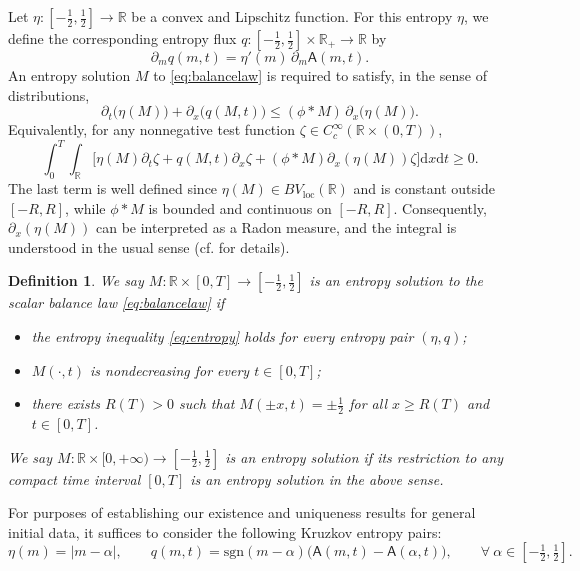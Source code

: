 \documentclass[10pt,a4paper]{amsart}
\newtheorem{definition}{Definition}[section]
\def\R{\mathbb{R}}
\def\dd{\mathrm{d}}
\def\pa{\partial}
\def\loc{\mathrm{loc}}
\def\A{\mathsf{A}}
\newcommand{\sgn}[1]{\mathrm{sgn}(#1)}
\begin{document}
	Let $\eta:[-\tfrac12,\tfrac12]\to \R$ be a convex and Lipschitz function. For this entropy $\eta$, we define the corresponding entropy flux $q:[-\tfrac12,\tfrac12]\times \R_+\to \R$ by
	\[
	\pa_m q(m,t) = \eta'(m)\, \pa_m \A(m,t).
	\]
	An entropy solution $M$ to \eqref{eq:balancelaw} is required to satisfy, in the sense of distributions,
	\begin{equation} \label{eq:entropy}
		\pa_t\big(\eta(M)\big) + \pa_x\big(q(M,t)\big) \le (\phi\ast M)\,\pa_x\big(\eta(M)\big).
	\end{equation}
	Equivalently, for any nonnegative test function $\zeta\in C_c^\infty(\R\times (0,T))$,
	\begin{equation} \label{eq:entropydist}
		\int_0^{T} \int_\R \Big[\eta(M) \pa_t \zeta + q(M,t)\pa_x \zeta 
		+ (\phi\ast M)\pa_x (\eta(M))\zeta \Big] \dd x \dd t \ge 0.
	\end{equation}
	The last term is well defined since $\eta(M)\in BV_{\loc}(\R)$ and is constant outside $[-R,R]$, while $\phi*M$ is bounded and continuous on $[-R,R]$. Consequently, $\pa_x(\eta(M))$ can be interpreted as a Radon measure, and the integral is understood in the usual sense (cf. \cite{leslie2023sticky} for details).
	
	\begin{definition}
			We say $M : \R \times [0,T] \to [-\frac12,\frac12]$ is an \emph{entropy solution} to the scalar balance law \eqref{eq:balancelaw} if
		\begin{itemize}
			\item the entropy inequality \eqref{eq:entropy} holds for every entropy pair $(\eta,q)$;
			\item $M(\cdot,t)$ is nondecreasing for every $t\in[0,T]$;
			\item there exists $R(T)>0$ such that $M(\pm x,t)=\pm\frac12$ for all $x\ge R(T)$ and $t\in[0,T]$.
		\end{itemize}
		We say $M : \R \times [0,+\infty) \to [-\frac12,\frac12]$ is an entropy solution if its restriction to any compact time interval $[0,T]$ is an entropy solution in the above sense.
	\end{definition}
	
	For purposes of establishing our existence and uniqueness results for general initial data, it suffices to consider the following Kruzkov entropy pairs:
	\begin{equation}
		\label{eq:Kruzkovpair}
		\eta(m) = |m - \alpha|, \qquad 
		q(m,t) = \sgn{m - \alpha}\big(\A(m,t) - \A(\alpha,t)\big), \qquad
		\forall~\alpha\in [-\tfrac12,\tfrac12].
	\end{equation}
	
\end{document}
